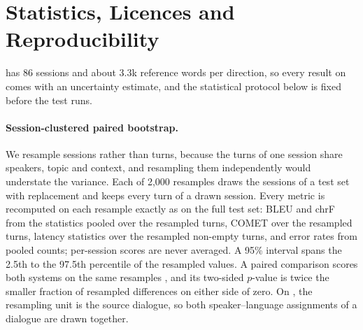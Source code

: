 \section{Statistics, Licences and Reproducibility}\label{app:repro}

\taxi has 86 sessions and about 3.3k reference words per direction, so every result on \bench comes with an uncertainty estimate, and the statistical protocol below is fixed before the test runs.



\paragraph{Session-clustered paired bootstrap.}
We resample sessions rather than turns, because the turns of one session share speakers, topic and context, and resampling them independently would understate the variance. Each of 2,000 resamples draws the sessions of a test set with replacement and keeps every turn of a drawn session. Every metric is recomputed on each resample exactly as on the full test set: BLEU and chrF from the statistics pooled over the resampled turns, COMET over the resampled turns, latency statistics over the resampled non-empty turns, and error rates from pooled counts; per-session scores are never averaged. A 95\% interval spans the 2.5th to the 97.5th percentile of the resampled values. A paired comparison scores both systems on the same resamples \citep{koehn2004statistical}, and its two-sided $p$-value is twice the smaller fraction of resampled differences on either side of zero. On \syn, the resampling unit is the source dialogue, so both speaker--language assignments of a dialogue are drawn together.

